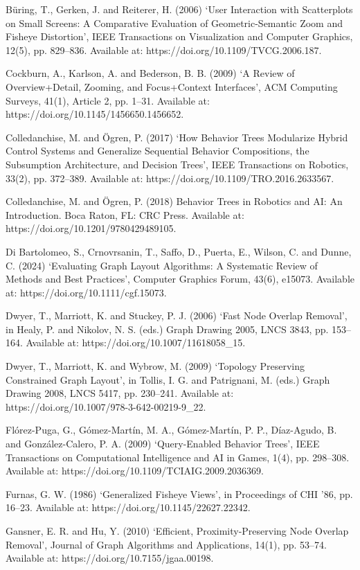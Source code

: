\documentclass[11pt,a4paper,oneside,extrafontsizes]{memoir}
\begin{document}
Büring, T., Gerken, J. and Reiterer, H. (2006) ‘User Interaction with Scatterplots on Small Screens: A Comparative Evaluation of Geometric-Semantic Zoom and Fisheye Distortion’, IEEE Transactions on Visualization and Computer Graphics, 12(5), pp. 829–836. Available at: https://doi.org/10.1109/TVCG.2006.187.

Cockburn, A., Karlson, A. and Bederson, B. B. (2009) ‘A Review of Overview+Detail, Zooming, and Focus+Context Interfaces’, ACM Computing Surveys, 41(1), Article 2, pp. 1–31. Available at: https://doi.org/10.1145/1456650.1456652.

Colledanchise, M. and Ögren, P. (2017) ‘How Behavior Trees Modularize Hybrid Control Systems and Generalize Sequential Behavior Compositions, the Subsumption Architecture, and Decision Trees’, IEEE Transactions on Robotics, 33(2), pp. 372–389. Available at: https://doi.org/10.1109/TRO.2016.2633567.

Colledanchise, M. and Ögren, P. (2018) Behavior Trees in Robotics and AI: An Introduction. Boca Raton, FL: CRC Press. Available at: https://doi.org/10.1201/9780429489105.

Di Bartolomeo, S., Crnovrsanin, T., Saffo, D., Puerta, E., Wilson, C. and Dunne, C. (2024) ‘Evaluating Graph Layout Algorithms: A Systematic Review of Methods and Best Practices’, Computer Graphics Forum, 43(6), e15073. Available at: https://doi.org/10.1111/cgf.15073.

Dwyer, T., Marriott, K. and Stuckey, P. J. (2006) ‘Fast Node Overlap Removal’, in Healy, P. and Nikolov, N. S. (eds.) Graph Drawing 2005, LNCS 3843, pp. 153–164. Available at: https://doi.org/10.1007/11618058\_15.

Dwyer, T., Marriott, K. and Wybrow, M. (2009) ‘Topology Preserving Constrained Graph Layout’, in Tollis, I. G. and Patrignani, M. (eds.) Graph Drawing 2008, LNCS 5417, pp. 230–241. Available at: https://doi.org/10.1007/978-3-642-00219-9\_22.

Flórez-Puga, G., Gómez-Martín, M. A., Gómez-Martín, P. P., Díaz-Agudo, B. and González-Calero, P. A. (2009) ‘Query-Enabled Behavior Trees’, IEEE Transactions on Computational Intelligence and AI in Games, 1(4), pp. 298–308. Available at: https://doi.org/10.1109/TCIAIG.2009.2036369.

Furnas, G. W. (1986) ‘Generalized Fisheye Views’, in Proceedings of CHI ’86, pp. 16–23. Available at: https://doi.org/10.1145/22627.22342.

Gansner, E. R. and Hu, Y. (2010) ‘Efficient, Proximity-Preserving Node Overlap Removal’, Journal of Graph Algorithms and Applications, 14(1), pp. 53–74. Available at: https://doi.org/10.7155/jgaa.00198.
\end{document}

